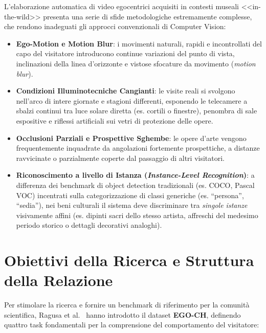 \documentclass[a4paper,12pt]{report}
\begin{document}
L'elaborazione automatica di video egocentrici acquisiti in contesti museali <<in-the-wild>> presenta una serie di sfide metodologiche estremamente complesse, che rendono inadeguati gli approcci convenzionali di Computer Vision:

\begin{itemize}
    \item \textbf{Ego-Motion e Motion Blur}: i movimenti naturali, rapidi e incontrollati del capo del visitatore introducono continue variazioni del punto di vista, inclinazioni della linea d'orizzonte e vistose sfocature da movimento (\emph{motion blur}).
    \item \textbf{Condizioni Illuminotecniche Cangianti}: le visite reali si svolgono nell'arco di intere giornate e stagioni differenti, esponendo le telecamere a sbalzi continui tra luce solare diretta (es. cortili o finestre), penombra di sale espositive e riflessi artificiali sui vetri di protezione delle opere.
    \item \textbf{Occlusioni Parziali e Prospettive Sghembe}: le opere d'arte vengono frequentemente inquadrate da angolazioni fortemente prospettiche, a distanze ravvicinate o parzialmente coperte dal passaggio di altri visitatori.
    \item \textbf{Riconoscimento a livello di Istanza (\emph{Instance-Level Recognition})}: a differenza dei benchmark di object detection tradizionali (es. COCO, Pascal VOC) incentrati sulla categorizzazione di classi generiche (es. ``persona'', ``sedia''), nei beni culturali il sistema deve discriminare tra \emph{singole istanze} visivamente affini (es. dipinti sacri dello stesso artista, affreschi del medesimo periodo storico o dettagli decorativi analoghi).
\end{itemize}

\section{Obiettivi della Ricerca e Struttura della Relazione}

Per stimolare la ricerca e fornire un benchmark di riferimento per la comunità scientifica, Ragusa et al.~\cite{egoref} hanno introdotto il dataset \textbf{EGO-CH}, definendo quattro task fondamentali per la comprensione del comportamento del visitatore:
\end{document}
